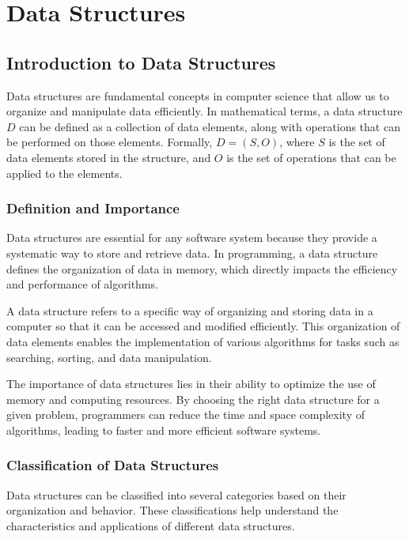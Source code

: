 \documentclass[12pt]{book} %
\begin{document}
\chapter{Data Structures}

\section{Introduction to Data Structures}

Data structures are fundamental concepts in computer science that allow us to organize and manipulate data efficiently. In mathematical terms, a data structure \(D\) can be defined as a collection of data elements, along with operations that can be performed on those elements. Formally, \(D = (S, O)\), where \(S\) is the set of data elements stored in the structure, and \(O\) is the set of operations that can be applied to the elements.

\subsection{Definition and Importance}

Data structures are essential for any software system because they provide a systematic way to store and retrieve data. In programming, a data structure defines the organization of data in memory, which directly impacts the efficiency and performance of algorithms.

A data structure refers to a specific way of organizing and storing data in a computer so that it can be accessed and modified efficiently. This organization of data elements enables the implementation of various algorithms for tasks such as searching, sorting, and data manipulation.

The importance of data structures lies in their ability to optimize the use of memory and computing resources. By choosing the right data structure for a given problem, programmers can reduce the time and space complexity of algorithms, leading to faster and more efficient software systems.

\subsection{Classification of Data Structures}

Data structures can be classified into several categories based on their organization and behavior. These classifications help understand the characteristics and applications of different data structures.
\end{document}
